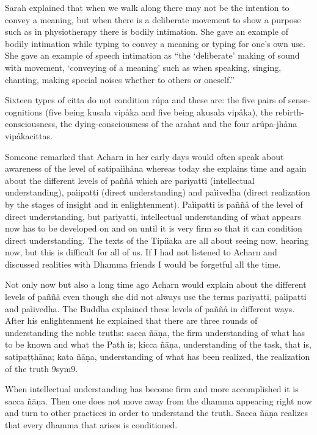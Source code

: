 \documentclass[10pt,a4paper,final]{article}
\begin{document}
Sarah explained that when we walk along
there may not be the intention to convey a meaning, but when there is a
deliberate movement to show a purpose such as in physiotherapy there is
bodily intimation. She gave an example of bodily intimation while typing
to convey a meaning or typing for one's own use. She gave an
example of speech intimation as ``the
`deliberate' making of sound with movement, `conveying of a meaning'
such as when speaking, singing, chanting, making special noises whether
to others or oneself.'' 

Sixteen types of citta do not condition rúpa
and these are: the five pairs of sense-cognitions (five being kusala
vipåka and five being akusala vipåka), the rebirth-consciousness, the
dying-consciousness of the arahat and the four arúpa-jhåna vipåkacittas.


Someone remarked that Acharn in her early
days would often speak about awareness of the level of satipaììhåna
whereas today she explains time and again about the different levels of
paññå which are pariyatti (intellectual understanding), paìipatti
(direct understanding) and paìivedha (direct realization by the stages
of insight and in enlightenment). Paìipatti is paññå of the level of
direct understanding, but pariyatti, intellectual understanding of what
appears now has to be developed on and on until it is very firm so that
it can condition direct understanding. The texts of the Tipiìaka are all
about seeing now, hearing now, but this is difficult for all of us. If I
had not listened to Acharn and discussed realities with Dhamma friends I
would be forgetful all the time. 

Not only now but also a long time ago Acharn
would explain about the different levels of paññå even though she did
not always use the terms pariyatti,
paìipatti and
paìivedha. The
Buddha explained these levels of paññå in different ways. After his
enlightenment he explained that there are three rounds of understanding
the noble truths: sacca
ñāṇa, the firm understanding of
what has to be known and what the Path is; kicca
ñāṇa, understanding of the task,
that is, satipaṭṭhāna; kata
ñāṇa, understanding of what has
been realized, the realization of the truth
\protect\hyperlinksdfootnote9sym9.

When intellectual understanding has
become firm and more accomplished it
is sacca ñāṇa.
Then one does not move away from the dhamma appearing right now and turn
to other practices in order to understand the truth. Sacca
ñāṇa realizes that every dhamma
that arises is conditioned. 
\end{document}

